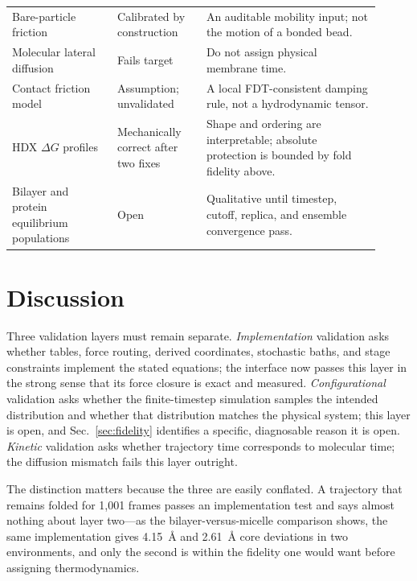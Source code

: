 \documentclass[journal=jctcce,manuscript=article,layout=twocolumn]{achemso}
\begin{document}
\begin{table}[ht]
\begin{tabular}{
  >{\raggedright\arraybackslash}p{0.26\linewidth}
  >{\raggedright\arraybackslash}p{0.22\linewidth}
  >{\raggedright\arraybackslash}p{0.43\linewidth}}
Bare-particle friction &
Calibrated by construction &
An auditable mobility input; not the motion of a bonded bead. \\
Molecular lateral diffusion &
Fails target &
Do not assign physical membrane time. \\
Contact friction model &
Assumption; unvalidated &
A local FDT-consistent damping rule, not a hydrodynamic tensor. \\
HDX $\Delta G$ profiles &
Mechanically correct after two fixes &
Shape and ordering are interpretable; absolute protection is bounded by fold
fidelity above. \\
Bilayer and protein equilibrium populations &
Open &
Qualitative until timestep, cutoff, replica, and ensemble convergence pass. \\
\bottomrule
\end{tabular}
\end{table}

\section{Discussion}

Three validation layers must remain separate. \emph{Implementation} validation asks
whether tables, force routing, derived coordinates, stochastic baths, and stage
constraints implement the stated equations; the interface now passes this layer in
the strong sense that its force closure is exact and measured. \emph{Configurational}
validation asks whether the finite-timestep simulation samples the intended
distribution and whether that distribution matches the physical system; this layer is
open, and Sec.~\ref{sec:fidelity} identifies a specific, diagnosable reason it is
open. \emph{Kinetic} validation asks whether trajectory time corresponds to molecular
time; the diffusion mismatch fails this layer outright.

The distinction matters because the three are easily conflated. A trajectory that
remains folded for 1{,}001 frames passes an implementation test and says almost
nothing about layer two---as the bilayer-versus-micelle comparison shows, the same
implementation gives 4.15~\AA{} and 2.61~\AA{} core deviations in two environments,
and only the second is within the fidelity one would want before assigning
thermodynamics.
\end{document}
